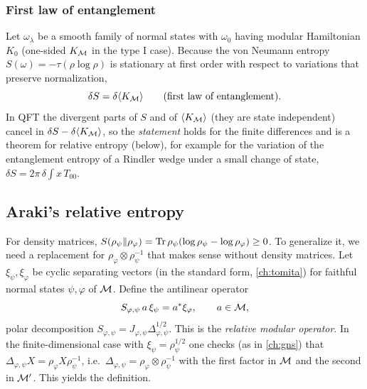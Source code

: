 \subsubsection*{First law of entanglement}
Let $\omega_\lambda$ be a smooth family of normal states with $\omega_0$ having modular Hamiltonian $K_0$ (one-sided $K_{\mathcal{M}}$ in the type I case). Because the von Neumann entropy $S(\omega)=-\tau(\rho\log\rho)$ is stationary at first order with respect to variations that preserve normalization,
\begin{equation}
\delta S=\delta\langle K_{\mathcal{M}}\rangle\qquad\text{(first law of entanglement)}.
\end{equation}
In QFT the divergent parts of $S$ and of $\langle K_{\mathcal{M}}\rangle$ (they are state independent) cancel in $\delta S-\delta\langle K_{\mathcal{M}}\rangle$, so the \emph{statement} holds for the finite differences and is a theorem for relative entropy (below), for example for the variation of the entanglement entropy of a Rindler wedge under a small change of state, $\delta S=2\pi\,\delta\int x\,T_{00}$.

\subsection{Araki's relative entropy}

For density matrices, $S(\rho_\psi\|\rho_\varphi)=\operatorname{Tr}\rho_\psi(\log\rho_\psi-\log\rho_\varphi)\ge0$. To generalize it, we need a replacement for $\rho_\varphi\otimes\rho_\psi^{-1}$ that makes sense without density matrices. Let $\xi_\psi,\xi_\varphi$ be cyclic separating vectors (in the standard form, \cref{ch:tomita}) for faithful normal states $\psi,\varphi$ of $\mathcal{M}$. Define the antilinear operator
\begin{equation}
S_{\varphi,\psi}\,a\,\xi_\psi=a^{*}\xi_\varphi,\qquad a\in\mathcal{M},
\end{equation}
polar decomposition $S_{\varphi,\psi}=J_{\varphi,\psi}\Delta_{\varphi,\psi}^{1/2}$. This is the \emph{relative modular operator}. In the finite-dimensional case with $\xi_\psi=\rho_\psi^{1/2}$ one checks (as in \cref{ch:gns}) that $\Delta_{\varphi,\psi}X=\rho_\varphi X\rho_\psi^{-1}$, i.e.\ $\Delta_{\varphi,\psi}=\rho_\varphi\otimes\rho_\psi^{-1}$ with the first factor in $\mathcal{M}$ and the second in $\mathcal{M}'$. This yields the definition.

